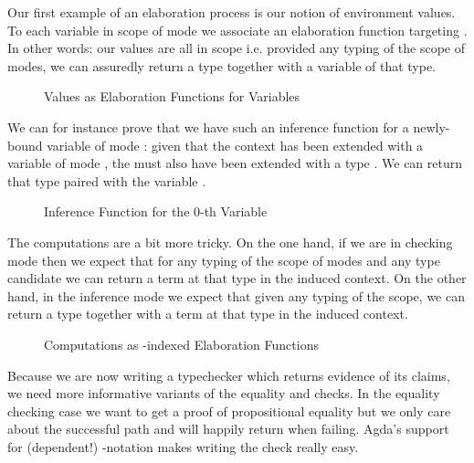 Our first example of an elaboration process is our notion of environment values.
To each variable in scope of mode  we associate an elaboration function
targeting . In other words: our values are all in scope i.e. provided any
typing of the scope of modes, we can assuredly return a type together with a
variable of that type.

\begin{figure}[h!]
\caption{Values as Elaboration Functions for Variables\label{fig:elabvalues}}
\end{figure}

We can for instance prove that we have such an inference function for a newly-bound
variable of mode : given that the context has been extended with a variable
of mode , the  must also have been extended with a type .
We can return that type paired with the variable .

\begin{figure}[h]
\caption{Inference Function for the 0-th Variable\label{fig:elabvar0}}
\end{figure}

The computations are a bit more tricky. On the one hand, if we are in
checking mode then we expect that for any typing of the scope of modes
and any type candidate we can  return a term at that type
in the induced context. On the other hand, in the inference mode we
expect that given any typing of the scope, we can  return
a type together with a term at that type in the induced context.

\begin{figure}[h]
\caption{Computations as -indexed Elaboration Functions\label{fig:elabcomputations}}
\end{figure}

Because we are now writing a typechecker which returns evidence of its
claims, we need more informative variants of the equality and
 checks.
%
In the equality checking case we want to get a proof of propositional
equality but we only care about the successful path and will happily
return  when failing. Agda's support for (dependent!)
-notation makes writing the check really easy.

